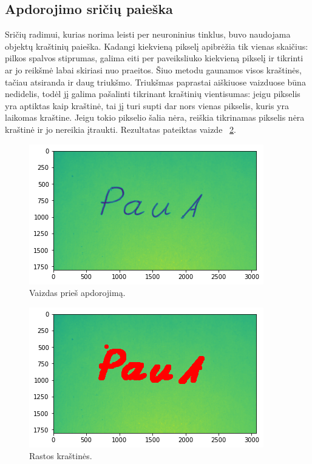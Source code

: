 \documentclass[conference]{IEEEtran}
\begin{document}
\subsection{Apdorojimo sričių paieška}


Sričių radimui, kurias norima leisti per neuroninius tinklus, buvo naudojama
objektų kraštinių paieška. Kadangi kiekvieną pikselį apibrėžia tik vienas skaičius:
pilkos spalvos stiprumas, galima eiti per paveiksliuko kiekvieną pikselį ir
tikrinti ar jo reikšmė labai skiriasi nuo praeitos. Šiuo metodu gaunamos visos kraštinės,
tačiau atsiranda ir daug triukšmo. Triukšmas paprastai aiškiuose vaizduose būna nedidelis, todėl
jį galima pašalinti tikrinant kraštinių vientisumas: jeigu pikselis yra aptiktas kaip kraštinė,
tai jį turi supti dar nors vienas pikselis, kuris yra laikomas kraštine. Jeigu tokio pikselio šalia nėra,
reiškia tikrinamas pikselis nėra kraštinė ir jo nereikia įtraukti. Rezultatas pateiktas vaizde ~\ref{fig3}.

\begin{figure}[!h] %
\centerline{\includegraphics[scale=0.4] {images/before.png}}
\caption{Vaizdas prieš apdorojimą.}
\label{fig2}
\end{figure}

\begin{figure}[!h] %
\centerline{\includegraphics[scale=0.4] {images/after.png}}
\caption{Rastos kraštinės.}
\label{fig3}
\end{figure}
\end{document}
